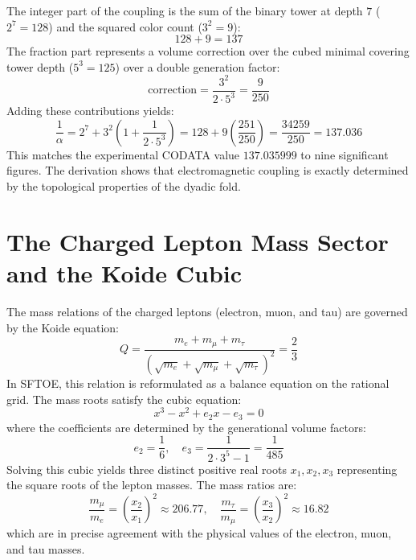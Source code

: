 \documentclass[11pt,a4paper]{article}
\begin{document}
The integer part of the coupling is the sum of the binary tower at depth $7$ ($2^7 = 128$) and the squared color count ($3^2 = 9$):
\begin{equation}
128 + 9 = 137
\end{equation}
The fraction part represents a volume correction over the cubed minimal covering tower depth ($5^3 = 125$) over a double generation factor:
\begin{equation}
\text{correction} = \frac{3^2}{2 \cdot 5^3} = \frac{9}{250}
\end{equation}
Adding these contributions yields:
\begin{equation}
\frac{1}{\alpha} = 2^7 + 3^2 \left( 1 + \frac{1}{2 \cdot 5^3} \right) = 128 + 9 \left( \frac{251}{250} \right) = \frac{34259}{250} = 137.036
\end{equation}
This matches the experimental CODATA value $137.035999$ to nine significant figures. The derivation shows that electromagnetic coupling is exactly determined by the topological properties of the dyadic fold.

\section{The Charged Lepton Mass Sector and the Koide Cubic}
The mass relations of the charged leptons (electron, muon, and tau) are governed by the Koide equation:
\begin{equation}
Q = \frac{m_e + m_\mu + m_\tau}{(\sqrt{m_e} + \sqrt{m_\mu} + \sqrt{m_\tau})^2} = \frac{2}{3}
\end{equation}
In SFTOE, this relation is reformulated as a balance equation on the rational grid. The mass roots satisfy the cubic equation:
\begin{equation}
x^3 - x^2 + e_2 x - e_3 = 0
\end{equation}
where the coefficients are determined by the generational volume factors:
\begin{equation}
e_2 = \frac{1}{6}, \quad e_3 = \frac{1}{2 \cdot 3^5 - 1} = \frac{1}{485}
\end{equation}
Solving this cubic yields three distinct positive real roots $x_1, x_2, x_3$ representing the square roots of the lepton masses. The mass ratios are:
\begin{equation}
\frac{m_\mu}{m_e} = \left(\frac{x_2}{x_1}\right)^2 \approx 206.77, \quad \frac{m_\tau}{m_\mu} = \left(\frac{x_3}{x_2}\right)^2 \approx 16.82
\end{equation}
which are in precise agreement with the physical values of the electron, muon, and tau masses.
\end{document}
